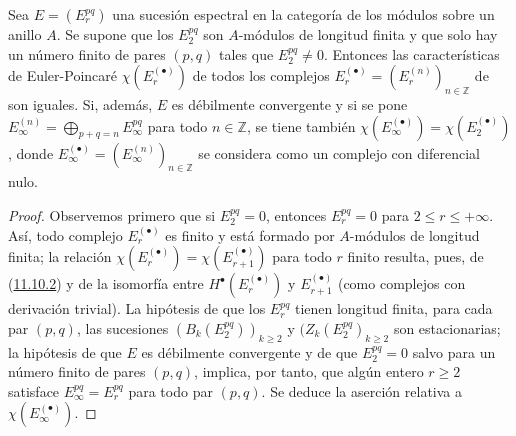 \begin{corollary}[11.10.3]
\label{0.11.10.3}
\label{0.11.10.3-fr}
Sea $E=(E_r^{pq})$ una sucesión espectral en la
categoría de los módulos sobre un anillo $A$.
Se supone que los $E_2^{pq}$ son $A$-módulos de longitud finita y que solo hay un número finito de pares $(p,q)$ tales que $E_2^{pq}\neq0$. Entonces las características de Euler-Poincaré
$\chi(E_r^{(\bullet)})$
de todos los complejos
$E_r^{(\bullet)}=(E_r^{(n)})_{n\in\mathbb Z}$
de  son iguales.
Si, además, $E$ es débilmente convergente y si se pone $E_\infty^{(n)}=\bigoplus_{p+q=n}E_\infty^{pq}$ para todo $n\in\mathbb Z$, se tiene también $\chi(E_\infty^{(\bullet)})=\chi(E_2^{(\bullet)})$,
donde
$E_\infty^{(\bullet)}=(E_\infty^{(n)})_{n\in\mathbb Z}$
se considera como un complejo con diferencial nulo.
\end{corollary}

\begin{proof}
Observemos primero que si $E_2^{pq}=0$, entonces
$E_r^{pq}=0$ para $2\leq r\leq+\infty$.
Así, todo complejo $E_r^{(\bullet)}$ es finito y está formado por
$A$-módulos de longitud finita; la relación $\chi(E_r^{(\bullet)})=\chi(E_{r+1}^{(\bullet)})$ para todo $r$ finito resulta, pues, de (\hyperref[0.11.10.2-fr]{11.10.2}) y de la isomorfía entre $H^\bullet(E_r^{(\bullet)})$ y $E_{r+1}^{(\bullet)}$ (como complejos con derivación trivial). La hipótesis de que los $E_r^{pq}$ tienen longitud finita, para cada par
$(p,q)$, las sucesiones
$(B_k(E_2^{pq}))_{k\geq2}$ y $(Z_k(E_2^{pq})_{k\geq2}$ son estacionarias;
la hipótesis de que $E$ es débilmente convergente y de que $E_2^{pq}=0$ salvo para un número finito de pares $(p,q)$, implica, por tanto,
que algún entero $r\geq2$ satisface
$E_\infty^{pq}=E_r^{pq}$
para todo par $(p,q)$.
Se deduce la aserción relativa a
$\chi(E_\infty^{(\bullet)})$.
\end{proof}
